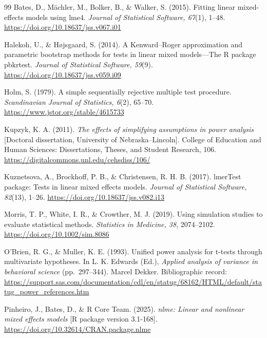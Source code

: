 \begin{thebibliography}{99}
Bates, D., M\"achler, M., Bolker, B., \& Walker, S. (2015).
Fitting linear mixed-effects models using lme4.
\emph{Journal of Statistical Software, 67}(1), 1--48.
\url{https://doi.org/10.18637/jss.v067.i01}

Halekoh, U., \& H\o jsgaard, S. (2014).
A Kenward--Roger approximation and parametric bootstrap methods for tests in linear mixed models---The R package pbkrtest.
\emph{Journal of Statistical Software, 59}(9).
\url{https://doi.org/10.18637/jss.v059.i09}

Holm, S. (1979). A simple sequentially rejective multiple test procedure.
\emph{Scandinavian Journal of Statistics, 6}(2), 65--70.
\url{https://www.jstor.org/stable/4615733}

Kupzyk, K. A. (2011). \emph{The effects of simplifying assumptions in power analysis}
[Doctoral dissertation, University of Nebraska--Lincoln]. College of Education and Human Sciences: Dissertations, Theses, and Student Research, 106.
\url{https://digitalcommons.unl.edu/cehsdiss/106/}

Kuznetsova, A., Brockhoff, P. B., \& Christensen, R. H. B. (2017).
lmerTest package: Tests in linear mixed effects models.
\emph{Journal of Statistical Software, 82}(13), 1--26.
\url{https://doi.org/10.18637/jss.v082.i13}

Morris, T. P., White, I. R., \& Crowther, M. J. (2019).
Using simulation studies to evaluate statistical methods.
\emph{Statistics in Medicine, 38}, 2074--2102.
\url{https://doi.org/10.1002/sim.8086}

O'Brien, R. G., \& Muller, K. E. (1993).
Unified power analysis for t-tests through multivariate hypotheses.
In L. K. Edwards (Ed.), \emph{Applied analysis of variance in behavioral science} (pp.~297--344). Marcel Dekker.
Bibliographic record: \url{https://support.sas.com/documentation/cdl/en/statug/68162/HTML/default/statug_power_references.htm}

Pinheiro, J., Bates, D., \& R Core Team. (2025).
\emph{nlme: Linear and nonlinear mixed effects models} [R package version 3.1-168].
\url{https://doi.org/10.32614/CRAN.package.nlme}


\end{thebibliography}
